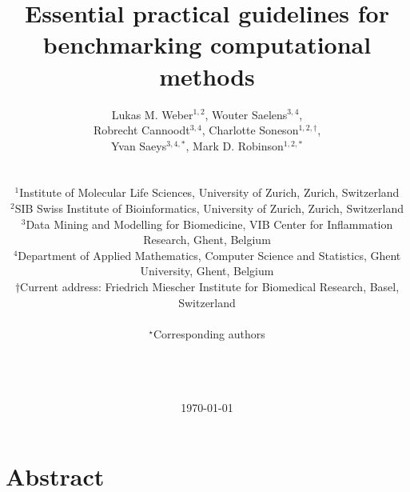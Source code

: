 \documentclass[12pt, a4paper]{article}
\begin{document}

\title{\Large{\textbf{
Essential practical guidelines for benchmarking computational methods
}}{\vskip 1cm}}

\author{
Lukas M. Weber$^{1,2}$,
Wouter Saelens$^{3,4}$,\\
Robrecht Cannoodt$^{3,4}$,
Charlotte Soneson$^{1,2,\dagger}$,\\
Yvan Saeys$^{3,4,*}$,
Mark D. Robinson$^{1,2,*}$\\ \\ \\
\footnotesize{$^1$Institute of Molecular Life Sciences, University of Zurich, Zurich, Switzerland}\\
\footnotesize{$^2$SIB Swiss Institute of Bioinformatics, University of Zurich, Zurich, Switzerland}\\
\footnotesize{$^3$Data Mining and Modelling for Biomedicine, VIB Center for Inflammation Research, Ghent, Belgium}\\
\footnotesize{$^4$Department of Applied Mathematics, Computer Science and Statistics, Ghent University, Ghent, Belgium}\\
\footnotesize{$\dagger$Current address: Friedrich Miescher Institute for Biomedical Research, Basel, Switzerland}\\ \\
\small{$^\star$Corresponding authors}\\ \\ \\ \\
}

\date{\today}



\begin{titlepage}

\maketitle

\thispagestyle{empty}

\end{titlepage}




\section*{Abstract}
\end{document}
